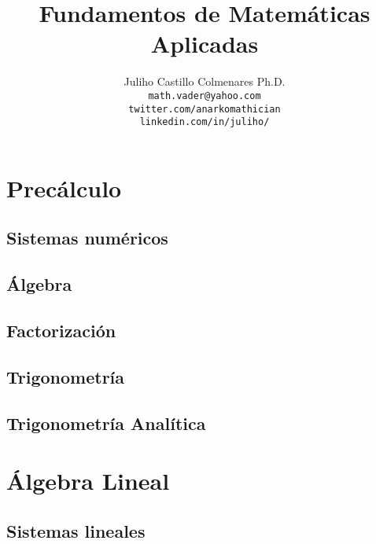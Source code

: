 \documentclass[
]{amsbook}
\title{Fundamentos de Matemáticas Aplicadas}
\author[J. Castillo]{Juliho Castillo Colmenares Ph.D.\\
\texttt{math.vader@yahoo.com}\\
\texttt{twitter.com/anarkomathician}\\
\texttt{linkedin.com/in/juliho/}}
\begin{document}
	\maketitle
	\tableofcontents


\part{Precálculo}

\chapter{Sistemas numéricos}










\chapter{Álgebra}








\chapter{Factorización}







\chapter{Trigonometría}


\chapter{Trigonometría Analítica}



\part{Álgebra Lineal}

\chapter{Sistemas lineales}





\end{document}

